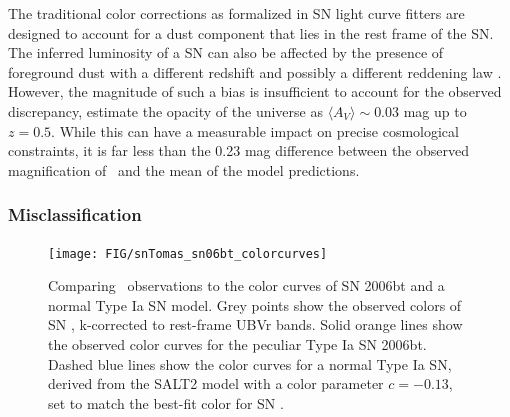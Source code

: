 The traditional color corrections as formalized in SN light curve
fitters are designed to account for a dust component that lies in the
rest frame of the SN.  The inferred luminosity of a SN can also be
affected by the presence of foreground dust with a different redshift
and possibly a different reddening law \citep{Menard:2010b}.  However,
the magnitude of such a bias is insufficient to account for the
observed discrepancy, \citet{Menard:2010a} estimate the opacity of the
universe as $\langle A_{V}\rangle\sim0.03$ mag up to $z=0.5$.  While
this can have a measurable impact on precise cosmological constraints,
it is far less than the 0.23 mag difference between the observed
magnification of \tomas\ and the mean of the model predictions.  


\subsubsection{Misclassification}
\label{sec:Misclassification}

\begin{figure}
\begin{center}
\texttt{[image: FIG/snTomas\_sn06bt\_colorcurves]}
\caption{ 
Comparing \tomas\ observations to the color curves of SN 2006bt and a
normal Type Ia SN model. Grey points show the observed colors of
SN \tomas, k-corrected to rest-frame UBVr bands. Solid orange lines
show the observed color curves for the peculiar Type Ia SN
2006bt. Dashed blue lines show the color curves for a normal Type Ia
SN, derived from the SALT2 model with a color parameter $c=-0.13$, set
to match the best-fit color for SN \tomas.
\label{fig:colorcomparison} }
\end{center}
\end{figure}

